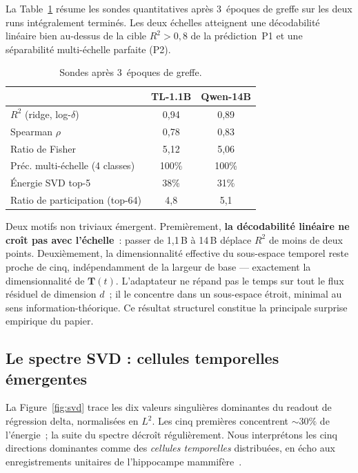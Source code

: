 \documentclass[10pt,twocolumn,letterpaper]{article}
\begin{document}
La Table~\ref{tab:probes} résume les sondes quantitatives après 3~époques de greffe sur les deux runs intégralement terminés. Les deux échelles atteignent une décodabilité linéaire bien au-dessus de la cible $R^2>0{,}8$ de la prédiction~P1 et une séparabilité multi-échelle parfaite (P2).

\begin{table}[H]
\centering
\small
\caption{Sondes après 3~époques de greffe.}
\label{tab:probes}
\begin{tabular}{@{}lcc@{}}
\toprule
 & \textbf{TL-1.1B} & \textbf{Qwen-14B} \\
\midrule
$R^2$ (ridge, log-$\delta$)        & 0{,}94  & 0{,}89 \\
Spearman $\rho$                    & 0{,}78  & 0{,}83 \\
Ratio de Fisher                    & 5{,}12  & 5{,}06 \\
Préc. multi-échelle (4 classes)    & 100\%   & 100\% \\
Énergie SVD top-5                  & 38\%    & 31\% \\
Ratio de participation (top-64)    & 4{,}8   & 5{,}1 \\
\bottomrule
\end{tabular}
\end{table}

Deux motifs non triviaux émergent. Premièrement, \textbf{la décodabilité linéaire ne croît pas avec l'échelle}~: passer de 1{,}1\,B à 14\,B déplace $R^2$ de moins de deux points. Deuxièmement, la dimensionnalité effective du sous-espace temporel reste proche de cinq, indépendamment de la largeur de base --- exactement la dimensionnalité de $\mathbf{T}(t)$. L'adaptateur ne répand pas le temps sur tout le flux résiduel de dimension $d$~; il le concentre dans un sous-espace étroit, minimal au sens information-théorique. Ce résultat structurel constitue la principale surprise empirique du papier.

\subsection{Le spectre SVD : cellules temporelles émergentes}

La Figure~\ref{fig:svd} trace les dix valeurs singulières dominantes du readout de régression delta, normalisées en $L^2$. Les cinq premières concentrent $\sim\!30\%$ de l'énergie~; la suite du spectre décroît régulièrement. Nous interprétons les cinq directions dominantes comme des \emph{cellules temporelles} distribuées, en écho aux enregistrements unitaires de l'hippocampe mammifère~\cite{macdonald2011}.
\end{document}
